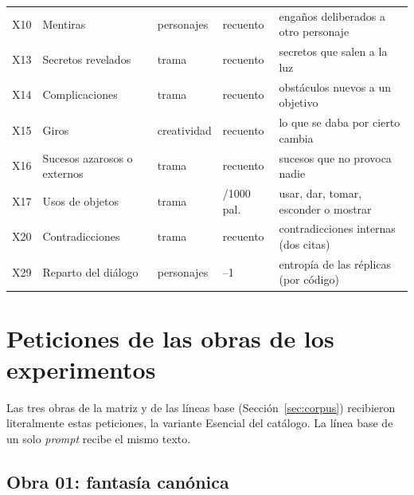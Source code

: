 \begin{table}[p]
\begin{tabular}{@{}l>{\raggedright\arraybackslash}p{3.5cm}>{\raggedright\arraybackslash}p{1.8cm}%
      >{\raggedright\arraybackslash}p{1.7cm}>{\raggedright\arraybackslash}p{6.3cm}@{}}
    X10 & Mentiras & personajes & recuento & engaños deliberados a otro personaje \\
    X13 & Secretos revelados & trama & recuento & secretos que salen a la luz \\
    X14 & Complicaciones & trama & recuento & obstáculos nuevos a un objetivo \\
    X15 & Giros & creatividad & recuento & lo que se daba por cierto cambia \\
    X16 & Sucesos azarosos o externos & trama & recuento & sucesos que no provoca nadie \\
    X17 & Usos de objetos & trama & /1000 pal. & usar, dar, tomar, esconder o mostrar \\
    X20 & Contradicciones & trama & recuento & contradicciones internas (dos citas) \\
    X29 & Reparto del diálogo & personajes & 0--1 & entropía de las réplicas (por código) \\
    \bottomrule
  \end{tabular}
\end{table}

\chapter{Peticiones de las obras de los experimentos}\label{app:obras}

Las tres obras de la matriz y de las líneas base (Sección~\ref{sec:corpus}) recibieron
literalmente estas peticiones, la variante Esencial del catálogo. La línea base de un solo
\textit{prompt} recibe el mismo texto.

\section*{Obra 01: fantasía canónica}


